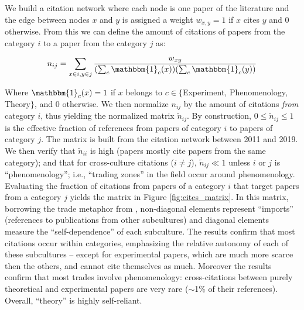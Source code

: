 \documentclass[smallextended]{svjour3}
\begin{document}
We build a citation network where each node is one paper of the literature and the edge between nodes $x$ and $y$ is assigned a weight $w_{x,y}=1$ if $x$ cites $y$ and 0 otherwise. From this we can define the amount of citations of papers from the category $i$ to a paper from the category $j$ as: 

\begin{equation}
    \label{eq:cite_matrix}
    n_{ij} = \sum_{x\in i, y\in j} \dfrac{w_{xy}}{(\sum_c \mathbbm{1}_c(x))(\sum_c \mathbbm{1}_c(y))} 
\end{equation}

Where $\mathbbm{1}_c(x)=1$ if $x$ belongs to $c \in \{$Experiment, Phenomenology, Theory$\}$, and 0 otherwise. 
We then normalize $n_{ij}$ by the amount of citations \textit{from} category $i$, thus yielding the normalized matrix $\tilde{n}_{ij}$. By construction, $0\leq \tilde{n}_{ij}\leq 1$ is the effective fraction of references from papers of category $i$ to papers of category $j$. The matrix is built from the citation network between 2011 and 2019. We then verify that $\tilde{n}_{ii}$ is high (papers mostly cite papers from the same category); and that for cross-culture citations ($i\neq j$), $\tilde{n}_{ij} \ll 1$ unless $i$ or $j$ is ``phenomenology''; i.e., ``trading zones'' in the field occur around phenomenology. Evaluating the fraction of citations from papers of a category $i$ that target papers from a category $j$ yields the matrix in Figure \ref{fig:cites_matrix}. In this matrix, borrowing the trade metaphor from \citet{Yan2013}, non-diagonal elements represent ``imports'' (references to publications from other subcultures) and diagonal elements measure the ``self-dependence'' of each subculture. The results confirm that most citations occur within categories, emphasizing the relative autonomy of each of these subcultures -- except for experimental papers, which are much more scarce then the others, and cannot cite themselves as much. Moreover the results confirm that most trades involve phenomenology: cross-citations between purely theoretical and experimental papers are very rare ($\sim$1\% of their references). Overall, ``theory'' is highly self-reliant.

\begin{figure*}
    \centering
    
    \caption{\textbf{Origin of the references (citations) in the \gls{hep} literature}
    Each matrix element $\tilde{n}_{ij}$ represents the fraction of references from the x-axis category (columns) that target papers from the y-axis category (lines). For instance, 49\% of references in experimental papers refer to experimental papers. 22\% of citations from phenomenological papers refer to experimental papers. If these categories were completely hermetic, the matrix would equal the identity matrix, which is not the case.}
    \label{fig:cites_matrix}
\end{figure*}


\end{document}

